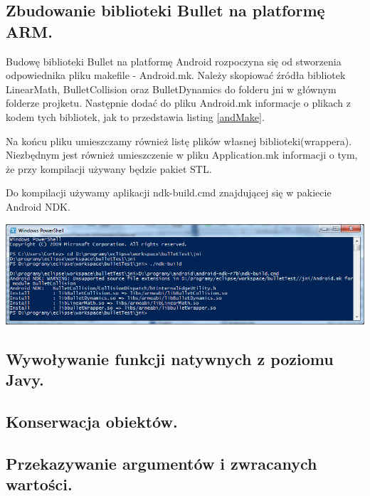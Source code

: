 \documentclass[12pt]{article}
\begin{document}
  \subsection{Zbudowanie biblioteki Bullet na platformę ARM.}
Budowę biblioteki Bullet na platformę Android rozpoczyna się od stworzenia odpowiednika pliku makefile - Android.mk. Należy skopiować źródła bibliotek LinearMath, BulletCollision oraz BulletDynamics do folderu jni w głównym folderze projketu. Następnie dodać do pliku Android.mk informacje o plikach z kodem tych bibliotek, jak to przedstawia listing \ref{andMake}.

Na końcu pliku umieszczamy również listę plików własnej biblioteki(wrappera). Niezbędnym jest również umieszczenie w pliku Application.mk informacji o tym, że przy kompilacji używany będzie pakiet STL.

Do kompilacji używamy aplikacji ndk-build.cmd znajdującej się w pakiecie Android NDK.

\includegraphics[width=\textwidth]{./img/ndk-build.png}

\subsection{Wywoływanie funkcji natywnych z poziomu Javy.}

\subsection{Konserwacja obiektów.}

\subsection{Przekazywanie argumentów i zwracanych wartości.}
\end{document}
